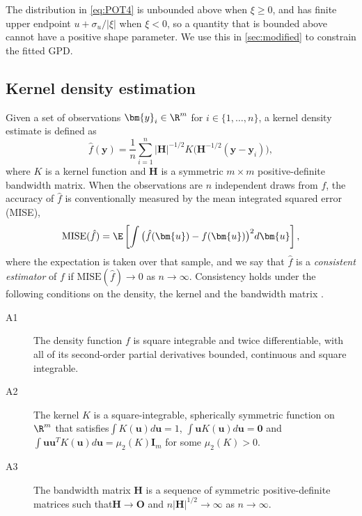 The distribution in \eqref{eq:POT4} is unbounded above when $\xi \ge 0$, and has finite upper endpoint $u + \sigma_u/|\xi|$ when $\xi < 0$, so a quantity that is bounded above cannot have a positive shape parameter. We use this in \cref{sec:modified} to constrain the fitted GPD.

\subsection{Kernel density estimation}

Given a set of observations $\bm{y}_{i} \in \R^m$ for $i \in \{1, \dots, n\}$, a kernel density estimate is defined as \citep{chacon2018multivariate}
\begin{equation}\label{eq:mkde}
  \hat{f}(\bm{y}) = \frac{1}{n} \sum_{i=1}^n |\bm{H}|^{-1/2} K\big(\bm{H}^{-1/2}(\bm{y} - \bm{y}_i)\big),
\end{equation}
where $K$ is a kernel function and $\bm{H}$ is a symmetric $m\times m$ positive-definite bandwidth matrix. When the observations are $n$ independent draws from $f$, the accuracy of $\hat{f}$ is conventionally measured by the mean integrated squared error (MISE),
\begin{equation}\label{eq:mise}
  \text{MISE}(\hat{f}) = \E\left[\int \big(\hat{f}(\bm{u}) - f(\bm{u})\big)^2 d\bm{u}\right],
\end{equation}
where the expectation is taken over that sample, and we say that $\hat{f}$ is a \emph{consistent estimator} of $f$ if $\text{MISE}(\hat{f})\rightarrow 0$ as $n\rightarrow\infty$. Consistency holds under the following conditions on the density, the kernel and the bandwidth matrix \citep[][pp.~31--37]{chacon2018multivariate}.

\begin{description}
  \item[A1] The density function $f$ is square integrable and twice differentiable, with all of its second-order partial derivatives bounded, continuous and square integrable.
  \item[A2] The kernel $K$ is a square-integrable, spherically symmetric function on $\R^m$ that satisfies\break $\int K(\bm{u})d\bm{u} = 1$, $\int \bm{u} K(\bm{u})d\bm{u} = \bm{0}$ and $\int \bm{u}\bm{u}^T K(\bm{u})d\bm{u} = \mu_2(K)\bm{I}_m$ for some $\mu_2(K) > 0$.
  \item[A3] The bandwidth matrix $\bm{H}$ is a sequence of symmetric positive-definite matrices such that\break $\bm{H}\rightarrow \bm{O}$ and $n|\bm{H}|^{1/2} \rightarrow \infty$ as $n\rightarrow\infty$.
\end{description}

